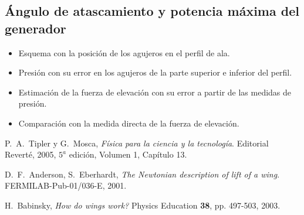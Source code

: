 \documentclass[11pt]{articulo}
\begin{document}
\subsection*{\'Angulo de atascamiento y potencia m\'axima del generador}

\begin{itemize}

\item{Esquema con la posici\'on de los agujeros en el perfil de ala.}
\item{Presi\'on con su error en los agujeros de la parte superior e inferior del perfil.}
\item{Estimaci\'on de la fuerza de elevaci\'on con su error a partir de las medidas de presi\'on.}
\item{Comparaci\'on con la medida directa de la fuerza de elevaci\'on.}

\end{itemize}



\begin{thebibliography}{X}

P.~A.~Tipler y G.~Mosca,
\textit{F\'isica para la ciencia y la tecnolog\'ia}. 
Editorial Revert\'e, 2005, $5^{a}$ edici\'on, Volumen 1, Cap\'itulo 13.

D.~F.~Anderson, S.~Eberhardt,
\textit{The Newtonian description of lift of a wing}.
FERMILAB-Pub-01/036-E, 2001.

H.~Babinsky,
{\it How do wings work?}
Physics Education {\bf 38}, pp. 497-503, 2003.

\end{thebibliography}


\end{document}

